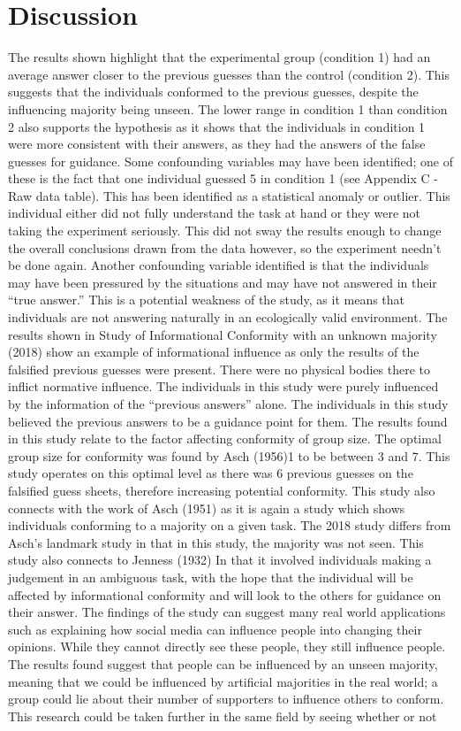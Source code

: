 \documentclass{report}
\begin{document}
\section{Discussion}
The results shown highlight that the experimental group (condition 1) had an average answer closer to the previous guesses than the control (condition 2). This suggests that the individuals conformed to the previous guesses, despite the influencing majority being unseen. The lower range in condition 1 than condition 2 also supports the hypothesis as it shows that the individuals in condition 1 were more consistent with their answers, as they had the answers of the false guesses for guidance. Some confounding variables may have been identified; one of these is the fact that one individual guessed 5 in condition 1 (see Appendix C - Raw data table). This has been identified as a statistical anomaly or outlier. This individual either did not fully understand the task at hand or they were not taking the experiment seriously. This did not sway the results enough to change the overall conclusions drawn from the data however, so the experiment needn’t be done again. Another confounding variable identified is that the individuals may have been pressured by the situations and may have not answered in their “true answer.” This is a potential weakness of the study, as it means that individuals are not answering naturally in an ecologically valid environment. The results shown in Study of Informational Conformity with an unknown majority (2018) show an example of informational influence as only the results of the falsified previous guesses were present. There were no physical bodies there to inflict normative influence. The individuals in this study were purely influenced by the information of the “previous answers” alone. The individuals in this study believed the previous answers to be a guidance point for them. The results found in this study relate to the factor affecting conformity of group size. The optimal group size for conformity was found by Asch (1956)1 to be between 3 and 7. This study operates on this optimal level as there was 6 previous guesses on the falsified guess sheets, therefore increasing potential conformity. This study also connects with the work of Asch (1951) as it is again a study which shows individuals conforming to a majority on a given task. The 2018 study differs from Asch’s landmark study in that in this study, the majority was not seen. This study also connects to Jenness (1932) In that it involved individuals making a judgement in an ambiguous task, with the hope that the individual will be affected by informational conformity and will look to the others for guidance on their answer. The findings of the study can suggest many real world applications such as explaining how social media can influence people into changing their opinions. While they cannot directly see these people, they still influence people. The results found suggest that people can be influenced by an unseen majority, meaning that we could be influenced by artificial majorities in the real world; a group could lie about their number of supporters to influence others to conform.  This research could be taken further in the same field by seeing whether or not 
\end{document}
